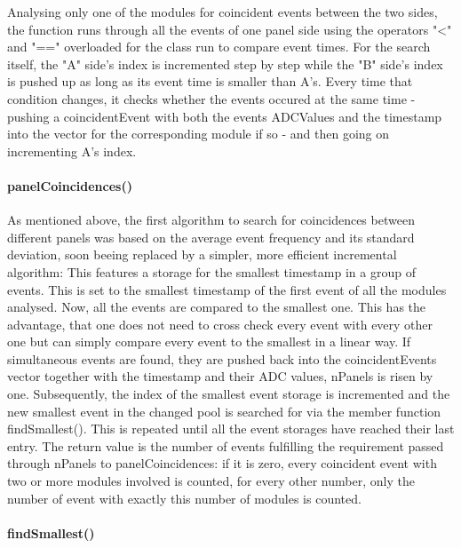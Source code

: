     Analysing only one of the modules for coincident events between the two sides, the function runs through all the events of one panel side using the operators "<" and "==" overloaded for the class run to compare event times. For the search itself, the "A" side's index is incremented step by step while the "B" side's index is pushed up as long as its event time is smaller than A's. Every time that condition changes, it checks whether the events occured at the same time - pushing a coincidentEvent with both the events ADCValues and the timestamp into the vector for the corresponding module if so - and then going on incrementing A's index.
    
    \paragraph{panelCoincidences()}
    \label{ch:Analysis software:sec:methods of the class run:subsec:panelCoincidences()}

    As mentioned above, the first algorithm to search for coincidences between different panels was based on the average event frequency and its standard deviation, soon beeing replaced by a simpler, more efficient incremental algorithm:
    This features a storage for the smallest timestamp in a group of events.  This is set to the smallest timestamp of the first event of all the modules analysed. Now, all the events are compared to the smallest one. This has the advantage, that one does not need to cross check every event with every other one but can simply compare every event to the smallest in a linear way. If simultaneous events are found, they are pushed back into the coincidentEvents vector together with the timestamp and their ADC values, nPanels is risen by one. Subsequently, the index of the smallest event storage is incremented and the new smallest event in the changed pool is searched for via the member function findSmallest(). This is repeated until all the event storages have reached their last entry.
    The return value is the number of events fulfilling the requirement passed through nPanels to panelCoincidences: if it is zero, every coincident event with two or more modules involved is counted, for every other number, only the number of event with exactly this number of modules is counted.

    \paragraph{findSmallest()}
    \label{ch:Analysis software:sec:methods of the class run:subsec:findSmallest()}
    
